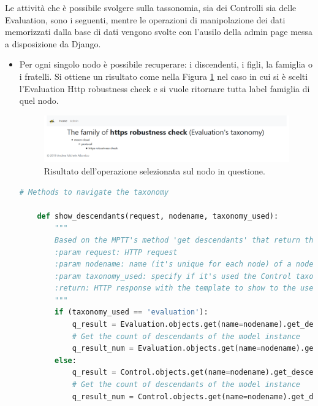 %
Le attività che è possibile svolgere sulla tassonomia, sia dei Controlli sia delle Evaluation, sono i seguenti, mentre le operazioni 
di manipolazione dei dati memorizzati dalla base di dati vengono svolte con l'ausilo della admin page messa a disposizione da Django.\hfill\break
\begin{itemize}
    \item Per ogni singolo nodo è possibile recuperare: i discendenti, i figli, la famiglia o i fratelli. Si ottiene un risultato come nella
    Figura \ref{fig:MCRS_taxnodedetails} nel caso in cui si è scelti l'Evaluation Http robustness check e si vuole ritornare tutta label
    famiglia di quel nodo.
    \begin{figure}[ht!]
        \includegraphics[scale=0.3]{images/MCRS_taxnodedetails.png}
        \caption{Risultato dell'operazione selezionata sul nodo in questione.}
        \label{fig:MCRS_taxnodedetails}
    \end{figure}
    \lstset{style=python_code_style}
    \begin{lstlisting}[language=Python, label=lst:view_tax_nodedetails, caption={Codice utilizzato all'interno delle View per 
        implementare le operazioni per restituire i discendenti, i figli, la famiglia o i fratelli.}]
    # Methods to navigate the taxonomy

    def show_descendants(request, nodename, taxonomy_used):
        """
        Based on the MPTT's method 'get descendants' that return the descendants of a model instance, in tree order
        :param request: HTTP request
        :param nodename: name (it's unique for each node) of a node in the taxonomy
        :param taxonomy_used: specify if it's used the Control taxonomy or the Evaluation taxonomy
        :return: HTTP response with the template to show to the user
        """
        if (taxonomy_used == 'evaluation'):
            q_result = Evaluation.objects.get(name=nodename).get_descendants(include_self=False)
            # Get the count of descendants of the model instance
            q_result_num = Evaluation.objects.get(name=nodename).get_descendant_count()
        else:
            q_result = Control.objects.get(name=nodename).get_descendants(include_self=False)
            # Get the count of descendants of the model instance
            q_result_num = Control.objects.get(name=nodename).get_descendant_count()


\end{lstlisting}
\end{itemize}

